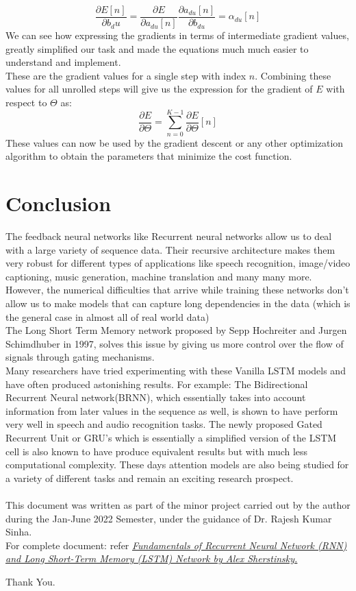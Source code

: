 \documentclass[12pt,a4paper]{article}
\begin{document}
{\[\]
\[ 
\frac{\partial{E[n]}}{\partial{{b_du}}} = \frac{\partial{E}}{\partial{a_{du}[n]}}\frac{\partial{a_{du}[n]}}{\partial{b_{du}}} = \alpha_{du}[n] \tag{78}
\]
We can see how expressing the gradients in terms of intermediate gradient values, greatly simplified our task and made the equations much much easier to understand and implement. 
\\
These are the gradient values for a single step with index $n$.
Combining these values for all unrolled steps will give us the expression for the gradient of $E$ with respect to $\Theta$ as:
\[
\frac{\partial{E}}{\partial{\Theta}} = \sum_{n=0}^{K-1}\frac{\partial{E}}{\partial{\Theta}}[n]\tag{79}
\]
These values can now be used by the gradient descent or any other optimization algorithm to obtain the parameters that minimize the cost function.
\section{Conclusion}
The feedback neural networks like Recurrent neural networks allow us to deal with a large variety of sequence data. Their recursive architecture makes them very robust for different types of applications like speech recognition, image/video captioning, music generation, machine translation and many many more. However, the numerical difficulties that arrive while training these networks don't allow us to make models that can capture long dependencies in the data (which is the general case in almost all of real world data)
\\
The Long Short Term Memory network proposed by Sepp Hochreiter and Jurgen Schimdhuber in 1997, solves this issue by giving us more control over the flow of signals through gating mechanisms.\\
Many researchers have tried experimenting with these Vanilla LSTM models and have often produced astonishing results.
For example: The Bidirectional Recurrent Neural network(BRNN), which essentially takes into account information from later values in the sequence as well, is shown to have perform very well in speech and audio recognition tasks. 
The newly proposed Gated Recurrent Unit or GRU's which is essentially a simplified version of the LSTM cell is also known to have produce equivalent results but with much less computational complexity. These days attention models are also being studied for a variety of different tasks and remain an exciting research prospect.
\\\\
This document was written as part of the minor project carried out by the author during the Jan-June 2022 Semester, under the guidance of Dr. Rajesh Kumar Sinha.\\ 
For complete document: refer
\textit{
\href{https://arxiv.org/pdf/1808.03314.pdf}{
Fundamentals of Recurrent Neural Network (RNN) and Long Short-Term Memory (LSTM) Network by Alex Sherstinsky.}}

Thank You.
}
\end{document}
